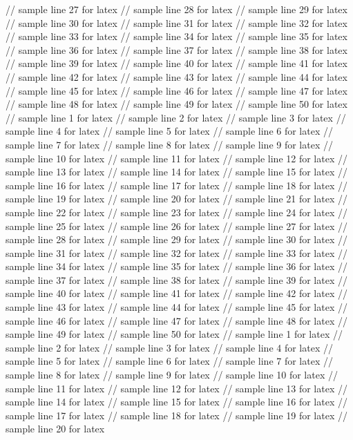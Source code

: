 // sample line 27 for latex
// sample line 28 for latex
// sample line 29 for latex
// sample line 30 for latex
// sample line 31 for latex
// sample line 32 for latex
// sample line 33 for latex
// sample line 34 for latex
// sample line 35 for latex
// sample line 36 for latex
// sample line 37 for latex
// sample line 38 for latex
// sample line 39 for latex
// sample line 40 for latex
// sample line 41 for latex
// sample line 42 for latex
// sample line 43 for latex
// sample line 44 for latex
// sample line 45 for latex
// sample line 46 for latex
// sample line 47 for latex
// sample line 48 for latex
// sample line 49 for latex
// sample line 50 for latex
// sample line 1 for latex
// sample line 2 for latex
// sample line 3 for latex
// sample line 4 for latex
// sample line 5 for latex
// sample line 6 for latex
// sample line 7 for latex
// sample line 8 for latex
// sample line 9 for latex
// sample line 10 for latex
// sample line 11 for latex
// sample line 12 for latex
// sample line 13 for latex
// sample line 14 for latex
// sample line 15 for latex
// sample line 16 for latex
// sample line 17 for latex
// sample line 18 for latex
// sample line 19 for latex
// sample line 20 for latex
// sample line 21 for latex
// sample line 22 for latex
// sample line 23 for latex
// sample line 24 for latex
// sample line 25 for latex
// sample line 26 for latex
// sample line 27 for latex
// sample line 28 for latex
// sample line 29 for latex
// sample line 30 for latex
// sample line 31 for latex
// sample line 32 for latex
// sample line 33 for latex
// sample line 34 for latex
// sample line 35 for latex
// sample line 36 for latex
// sample line 37 for latex
// sample line 38 for latex
// sample line 39 for latex
// sample line 40 for latex
// sample line 41 for latex
// sample line 42 for latex
// sample line 43 for latex
// sample line 44 for latex
// sample line 45 for latex
// sample line 46 for latex
// sample line 47 for latex
// sample line 48 for latex
// sample line 49 for latex
// sample line 50 for latex
// sample line 1 for latex
// sample line 2 for latex
// sample line 3 for latex
// sample line 4 for latex
// sample line 5 for latex
// sample line 6 for latex
// sample line 7 for latex
// sample line 8 for latex
// sample line 9 for latex
// sample line 10 for latex
// sample line 11 for latex
// sample line 12 for latex
// sample line 13 for latex
// sample line 14 for latex
// sample line 15 for latex
// sample line 16 for latex
// sample line 17 for latex
// sample line 18 for latex
// sample line 19 for latex
// sample line 20 for latex
